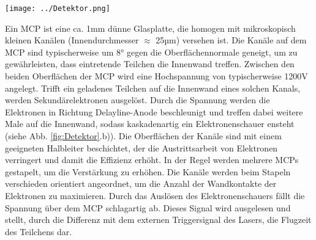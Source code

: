  \begin{center}
 	\begin{minipage}{\linewidth}
 		\centering
 		\texttt{[image: ../Detektor.png]}%
 		\label{fig:Detektor}
 	\end{minipage} 
 \end{center} 
 \clearpage
 Ein MCP ist eine ca. 1mm dünne Glasplatte, die homogen mit mikroskopisch kleinen Kanälen (Innendurchmesser $\approx$ 25µm) versehen ist. Die Kanäle auf dem MCP sind typischerweise um 8° gegen die Oberflächennormale geneigt, um zu gewährleisten, dass eintretende Teilchen die Innenwand treffen. Zwischen den beiden Oberflächen der MCP wird eine Hochspannung von typischerweise 1200V angelegt.
 Trifft ein geladenes Teilchen auf die Innenwand eines solchen Kanals, werden Sekundärelektronen ausgelöst. Durch die Spannung werden die Elektronen in Richtung Delayline-Anode beschleunigt und treffen dabei weitere Male auf die Innenwand, sodass kaskadenartig ein Elektronenschauer ensteht (siehe Abb. \ref{fig:Detektor}.b)). Die Oberflächen der Kanäle sind mit einem geeigneten Halbleiter beschichtet, der die Austrittsarbeit von Elektronen verringert und damit die Effizienz erhöht. 
 In der Regel werden mehrere MCPs gestapelt, um die Verstärkung zu erhöhen. Die Kanäle werden beim Stapeln verschieden orientiert angeordnet, um die Anzahl der Wandkontakte der Elektronen zu maximieren. %
 Durch das Auslösen des Elektronenschauers fällt die Spannung über dem MCP schlagartig ab. Dieses Signal wird ausgelesen und stellt, durch die Differenz mit dem externen Triggersignal des Lasers, die Flugzeit des Teilchens dar. 
 


